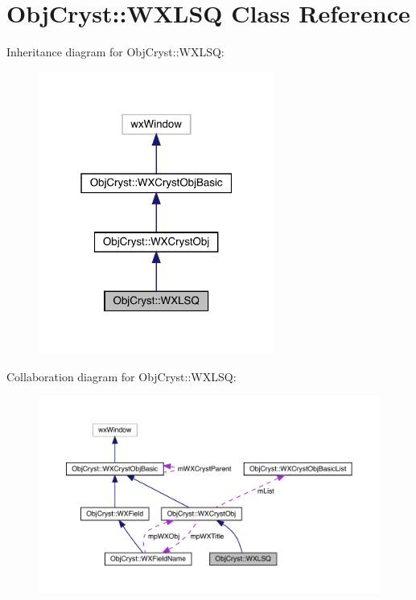 \hypertarget{class_obj_cryst_1_1_w_x_l_s_q}{}\section{Obj\+Cryst\+::W\+X\+L\+SQ Class Reference}
\label{class_obj_cryst_1_1_w_x_l_s_q}


Inheritance diagram for Obj\+Cryst\+::W\+X\+L\+SQ\+:
\nopagebreak
\begin{figure}[H]
\begin{center}
\leavevmode
\includegraphics[width=220pt]{class_obj_cryst_1_1_w_x_l_s_q__inherit__graph}
\end{center}
\end{figure}


Collaboration diagram for Obj\+Cryst\+::W\+X\+L\+SQ\+:
\nopagebreak
\begin{figure}[H]
\begin{center}
\leavevmode
\includegraphics[width=350pt]{class_obj_cryst_1_1_w_x_l_s_q__coll__graph}
\end{center}
\end{figure}
